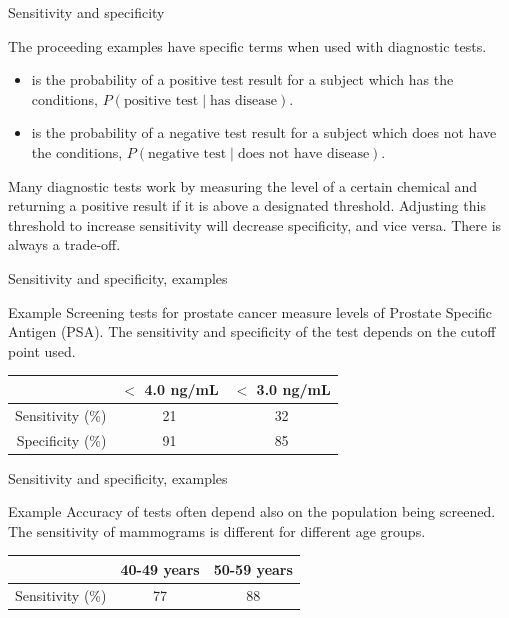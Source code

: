\documentclass[xcolor=table, aspectratio=169, bigger]{beamer}
\begin{document}
\begin{frame}{Sensitivity and specificity}
\begin{block}{}
The proceeding examples have specific terms when used with diagnostic tests.
\begin{itemize}
\pause
\item {} is the probability of a positive test result for a subject which has the conditions, $P(\text{positive test}\mid \text{has disease})$.
\pause
\item {} is the probability of a negative test result for a subject which does not have the conditions, $P(\text{negative test}\mid\text{does not have disease})$.
\end{itemize}

\pause
Many diagnostic tests work by measuring the level of a certain chemical and returning a positive result if it is above a designated threshold. Adjusting this threshold to increase sensitivity will decrease specificity, and vice versa. There is always a trade-off.
\end{block}
\end{frame}

\begin{frame}{Sensitivity and specificity, examples}
\begin{exampleblock}{Example}
Screening tests for prostate cancer measure levels of Prostate Specific Antigen (PSA). The sensitivity and specificity of the test depends on the cutoff point used.\\
\bigskip
{\centering
{}
\begin{tabular}{r | c c}
& $<$ 4.0 ng/mL & $<$ 3.0 ng/mL\\
\hline
Sensitivity (\%) & 21 & 32\\
Specificity (\%) & 91 & 85 
\end{tabular}
\par}
\end{exampleblock}
\end{frame}

\begin{frame}{Sensitivity and specificity, examples}
\begin{exampleblock}{Example}
Accuracy of tests often depend also on the population being screened. The sensitivity of mammograms is different for different age groups.\\
\bigskip
{\centering
{}
\begin{tabular}{r | c c}
& 40-49 years & 50-59 years\\
\hline
Sensitivity (\%) & 77 & 88\\
\end{tabular}
\par}
\end{exampleblock}
\end{frame}
\end{document}

